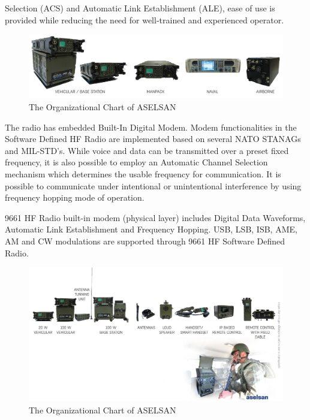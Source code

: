 	Selection (ACS) and Automatic Link Establishment (ALE), ease of use is provided while reducing the need for well-trained and experienced operator.

\begin{figure}[H]
	\center
	\setlength{\unitlength}{\textwidth} 
	\includegraphics[width=1.0\unitlength]{radio_type}
	\caption{\label{fig:radtyp}The Organizational Chart of ASELSAN }
\end{figure}

	The radio has embedded Built-In Digital Modem. Modem functionalities in the Software Defined HF Radio are implemented based on several NATO STANAGs and MIL-STD's. While voice and data can be transmitted over a preset fixed frequency, it is also possible to employ an Automatic Channel Selection mechanism which determines the usable frequency for communication. It is possible to communicate under intentional or unintentional interference by using frequency hopping mode of operation.

	9661 HF Radio built-in modem (physical layer) includes Digital Data Waveforms, Automatic Link Establishment and Frequency Hopping. USB, LSB, ISB, AME, AM and CW modulations are supported through 9661 HF Software Defined Radio.  

\begin{figure}[H]
	\center
	\setlength{\unitlength}{\textwidth} 
	\includegraphics[width=1.0\unitlength]{radios}
	\caption{\label{fig:rads}The Organizational Chart of ASELSAN }
\end{figure}

